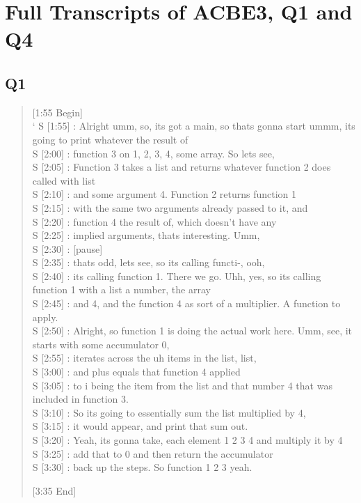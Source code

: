 \newpage

\section{Full Transcripts of ACBE3, Q1 and Q4}
\subsection{Q1}
\begin{quote}
[1:55 Begin] \\`
S [1:55] : Alright umm, so, its got a main, so thats gonna start ummm, its going to print whatever the result of \\
S [2:00] : function 3 on 1, 2, 3, 4, some array. So lets see, \\
S [2:05] : Function 3 takes a list and returns whatever function  2 does called with list \\
S [2:10] : and some argument 4. Function 2 returns function 1 \\
S [2:15] : with the same two arguments already passed to it, and \\
S [2:20] : function 4 the result of, which doesn't have any \\
S [2:25] : implied arguments, thats interesting. Umm, \\
S [2:30] : [pause] \\
S [2:35] : thats odd, lets see, so its calling functi-, ooh, \\
S [2:40] : its calling function 1. There we go. Uhh, yes, so its calling function 1 with a list a number, the array \\
S [2:45] : and 4, and the function 4 as sort of a multiplier. A function to apply. \\
S [2:50] : Alright, so function 1 is doing the actual work here. Umm, see, it starts with some accumulator 0,  \\
S [2:55] : iterates across the uh items in the list, list, \\
S [3:00] : and plus equals that function 4 applied \\
S [3:05] : to i being the item from the list and that number 4 that was included in function 3. \\
S [3:10] : So its going to essentially sum the list multiplied by 4, \\
S [3:15] : it would appear, and print that sum out. \\
S [3:20] : Yeah, its gonna take, each element 1 2 3 4 and multiply it by 4 \\
S [3:25] : add that to 0 and then return the accumulator \\
S [3:30] : back up the steps. So function 1 2 3 yeah. 

[3:35 End]
\end{quote}

